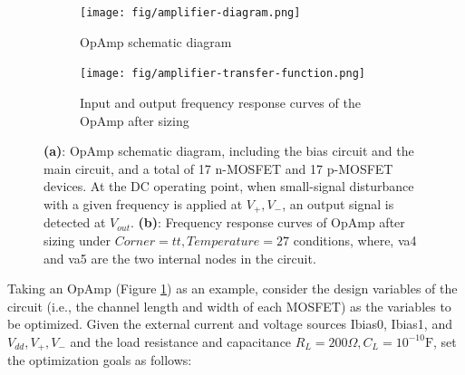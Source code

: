 \begin{figure}[htbp]
  \centering
  \begin{subfigure}{0.3\textwidth}
    \texttt{[image: fig/amplifier-diagram.png]}
    \caption{OpAmp schematic diagram \cite{OpAmpPNG}}
    \label{subfig:amplifier-diagram}
  \end{subfigure}
  \begin{subfigure}{0.65\textwidth}
    \texttt{[image: fig/amplifier-transfer-function.png]}
    \caption{Input and output frequency response curves of the OpAmp after sizing}
    \label{subfig:amplifier-transfer-function}
  \end{subfigure}
  \caption{\textbf{(a)}: OpAmp schematic diagram, including the bias circuit and the main circuit, and a total of 17 n-MOSFET and 17 p-MOSFET devices. At the DC operating point, when small-signal disturbance with a given frequency is applied at $V_+,V_-$, an output signal is detected at $V_{out}$. \textbf{(b)}: Frequency response curves of OpAmp after sizing under $Corner=tt,Temperature=27$ conditions, where, va4 and va5 are the two internal nodes in the circuit.}
\end{figure}
Taking an OpAmp (Figure \ref{subfig:amplifier-diagram}) as an example, consider the design variables of the circuit (i.e., the channel length and width of each MOSFET) as the variables to be optimized.
Given the external current and voltage sources Ibias0, Ibias1, and $V_{dd},V_+,V_-$ and the load resistance and capacitance $R_L=200\Omega,C_L=10^{-10}\text{F}$, set the optimization goals as follows:
